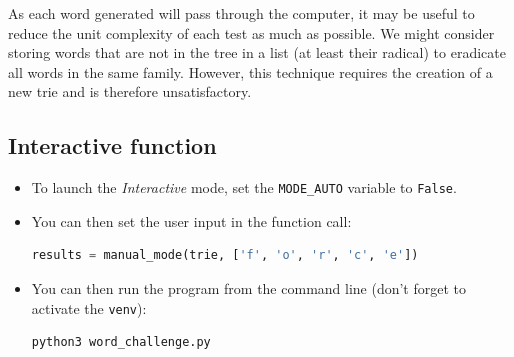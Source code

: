 \documentclass[10pt,a4paper,hidelinks]{article}
\begin{document}
As each word generated will pass through the computer, it may be useful to reduce the unit complexity of each test as much as possible. We might consider storing words that are not in the tree in a list (at least their radical) to eradicate all words in the same family. However, this technique requires the creation of a new trie and is therefore unsatisfactory.

\subsection{Interactive function}
\begin{itemize}
    \item To launch the \textit{Interactive} mode, set the \verb|MODE_AUTO| variable to \verb|False|.
    \item You can then set the user input in the function call:
\begin{lstlisting}[language=Python]
results = manual_mode(trie, ['f', 'o', 'r', 'c', 'e'])
\end{lstlisting}
    \item You can then run the program from the command line (don't forget to activate the \verb|venv|):
\begin{lstlisting}
python3 word_challenge.py
\end{lstlisting}
\end{itemize}
\end{document}
